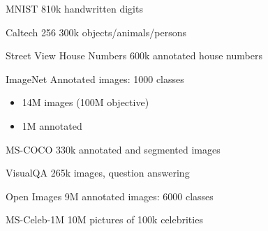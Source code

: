 \begin{frame}{MNIST}
  810k handwritten digits
\end{frame}

\begin{frame}{Caltech 256}
  300k objects/animals/persons
\end{frame}

\begin{frame}{Street View House Numbers}
  600k annotated house numbers
\end{frame}

\begin{frame}{ImageNet}
  Annotated images: 1000 classes
  \begin{itemize}
    \item 14M images (100M objective)
    \item 1M annotated
  \end{itemize}
\end{frame}

\begin{frame}{MS-COCO}
   330k annotated and segmented images
\end{frame}

\begin{frame}{VisualQA}
  265k images, question answering
\end{frame}

\begin{frame}{Open Images}
  9M annotated images: 6000 classes
\end{frame}

\begin{frame}{MS-Celeb-1M}
  10M pictures of 100k celebrities
\end{frame}
